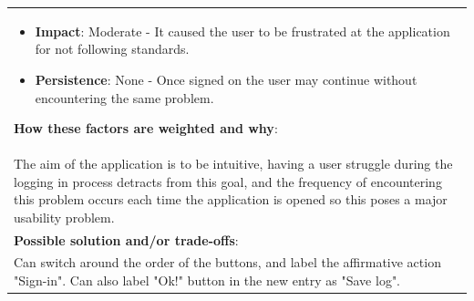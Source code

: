 \documentclass[pdftex,12pt,a4paper]{report}
\begin{document}
\begin{center}
\begin{tabular}{|p{\textwidth}|}
\begin{itemize}
	\item{\textbf{Impact}:} Moderate - It caused the user to be frustrated at the application for not following standards.
	\item{\textbf{Persistence}:} None - Once signed on the user may continue without encountering the same problem.
	\end{itemize}
	\textbf{How these factors are weighted and why}:\\
	The aim of the application is to be intuitive, having a user struggle during the logging in process detracts from this goal, and the frequency of encountering this problem occurs each time the application is opened so this poses a major usability problem.\\
	\hline
	\textbf{Possible solution and/or trade-offs}:\\
Can switch around the order of the buttons, and label the affirmative action "Sign-in". Can also label "Ok!" button in the new entry as "Save log".\\
	\hline
	\end{tabular}
\end{center}
\end{document}
